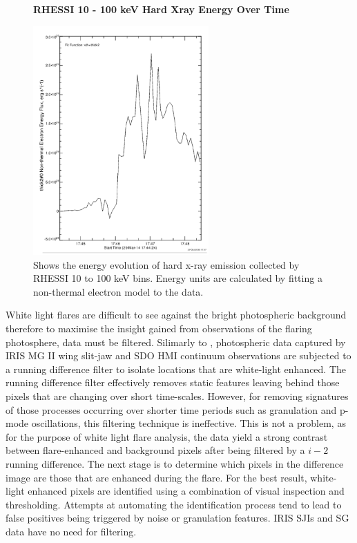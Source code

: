 \begin{figure}[H]
  \begin{center}
  \textbf{RHESSI 10 - 100 keV Hard Xray Energy Over Time}\par\medskip
  \includegraphics[width=0.6\textwidth]{rhessi-energy-curve}
  \end{center}
  \caption{Shows the energy evolution of hard x-ray emission collected by RHESSI 10 to 100 keV bins. Energy units are calculated by fitting a non-thermal electron model to the data. }\label{erhessi}
\end{figure}

White light flares are difficult to see against the bright photospheric background therefore to maximise the insight gained from observations of the flaring photosphere, data must be filtered. Silimarly to \cite{2014ApJ...783...98K}, photospheric data captured by IRIS MG II wing slit-jaw and SDO HMI continuum observations are subjected to a running difference filter to isolate locations that are white-light enhanced. The running difference filter effectively removes static features leaving behind those pixels that are changing over short time-scales. However, for removing signatures of those processes occurring over shorter time periods such as granulation and p-mode oscillations, this filtering technique is ineffective. This is not a problem, as for the purpose of white light flare analysis, the data yield a strong contrast between flare-enhanced and background pixels after being filtered by a $i-2$ running difference. The next stage is to determine which pixels in the difference image are those that are enhanced during the flare. For the best result, white-light enhanced pixels are identified using a combination of visual inspection and thresholding. Attempts at automating the identification process tend to lead to false positives being triggered by noise or granulation features. IRIS SJIs and SG data have no need for filtering.

